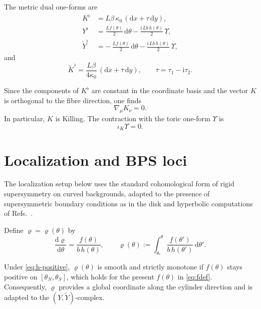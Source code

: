 \documentclass[11pt,a4paper]{article}
\numberwithin{equation}{section}
\theoremstyle{plain}
\theoremstyle{definition}
\theoremstyle{remark}
\newcommand{\ii}{\mathrm{i}}
\newcommand{\dd}{\mathrm{d}}
\newcommand{\nn}{\nonumber}
\begin{document}
The metric dual one-forms are
\begin{align}
K^\flat &= L\beta\,\kappa_0\,(\dd x+\tau\,\dd y),
\label{eq:Kform}\\
Y^\flat &= \frac{L f(\theta)}{2}\,\dd\theta-\frac{\ii\,L b\,h(\theta)}{2}\,\Upsilon, \nn\\
\widetilde Y^\flat &= -\,\frac{L f(\theta)}{2}\,\dd\theta-\frac{\ii\,L b\,h(\theta)}{2}\,\Upsilon,
\label{eq:forms}
\end{align}
and
\begin{equation}
\widetilde K^\flat = \frac{L\beta}{4\kappa_0}\,(\dd x+\overline\tau\,\dd y),
\qquad
\overline\tau=\tau_1-\ii\tau_2.
\label{eq:Ktilform}
\end{equation}


Since the components of $K^\flat$ are constant in the coordinate basis and the vector $K$ is orthogonal to the fibre direction, one finds
\begin{equation}
\nabla_\mu K_\nu = 0.
\label{eq:nablaK}
\end{equation}
In particular, $K$ is Killing.  The contraction with the toric one-form $\Upsilon$ is
\begin{equation}
\iota_K\Upsilon = 0.
\label{eq:iotaKfiber}
\end{equation}

\section{Localization and BPS loci}\label{sec:bps-loci}

The localization setup below uses the standard cohomological form of rigid supersymmetry on curved backgrounds, adapted to the presence of supersymmetric boundary conditions as in the disk and hyperbolic computations of Refs.~\cite{Festuccia:2011ws,Dumitrescu:2012ha,Festuccia:2020yff,Panerai:2020boq,Longhi:2019hdh,Iannotti:2023jji}.

Define $\varrho=\varrho(\theta)$ by
\begin{equation}
\frac{\dd\varrho}{\dd\theta}=\frac{f(\theta)}{b\,h(\theta)},
\qquad
\varrho(\theta):=\int_{\theta_*}^{\theta}\frac{f(\theta')}{b\,h(\theta')}\,\dd\theta'.
\label{eq:u}
\end{equation}

Under \eqref{eq:h-positive}, $\varrho(\theta)$ is smooth and strictly monotone if $f(\theta)$ stays positive on $[\theta_N,\theta_S]$, which holds for the present $f(\theta)$ in \eqref{eq:fdef}. Consequently, $\varrho$ provides a global coordinate along the cylinder direction and is adapted to the $(Y,\widetilde Y)$-complex.
\end{document}
